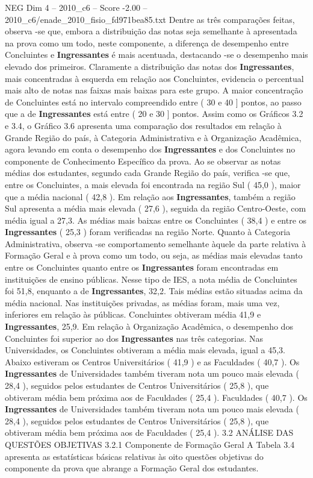 \begin{textsample}{NEG Dim 4 – 2010\_c6 – Score -2.00 – 2010\_c6/enade\_2010\_fisio\_fd971bea85.txt}
Dentre as três comparações feitas, observa -se que, embora a distribuição das notas seja semelhante à apresentada na prova como um todo, neste componente, a diferença de desempenho entre Concluintes e \textbf{Ingressantes} é mais acentuada, destacando -se o desempenho mais elevado dos primeiros.
Claramente a distribuição das notas dos \textbf{Ingressantes}, mais concentradas à esquerda em relação aos Concluintes, evidencia o percentual mais alto de notas nas faixas mais baixas para este grupo.
A maior concentração de Concluintes está no intervalo compreendido entre ( 30 e 40 ] pontos, ao passo que a de \textbf{Ingressantes} está entre ( 20 e 30 ] pontos.
Assim como os Gráficos 3.2 e 3.4, o Gráfico 3.6 apresenta uma comparação dos resultados em relação à Grande Região do país, à Categoria Administrativa e à Organização Acadêmica, agora levando em conta o desempenho dos \textbf{Ingressantes} e dos Concluintes no componente de Conhecimento Específico da prova.
Ao se observar as notas médias dos estudantes, segundo cada Grande Região do país, verifica -se que, entre os Concluintes, a mais elevada foi encontrada na região Sul ( 45,0 ), maior que a média nacional ( 42,8 ).
Em relação aos \textbf{Ingressantes}, também a região Sul apresenta a média mais elevada ( 27,6 ), seguida da região Centro-Oeste, com média igual a 27,3.
As médias mais baixas entre os Concluintes ( 38,4 ) e entre os \textbf{Ingressantes} ( 25,3 ) foram verificadas na região Norte.
Quanto à Categoria Administrativa, observa -se comportamento semelhante àquele da parte relativa à Formação Geral e à prova como um todo, ou seja, as médias mais elevadas tanto entre os Concluintes quanto entre os \textbf{Ingressantes} foram encontradas em instituições de ensino públicas.
Nesse tipo de IES, a nota média de Concluintes foi 51,8, enquanto a de \textbf{Ingressantes}, 32,2.
Tais médias estão situadas acima da média nacional.
Nas instituições privadas, as médias foram, mais uma vez, inferiores em relação às públicas.
Concluintes obtiveram média 41,9 e \textbf{Ingressantes}, 25,9.
Em relação à Organização Acadêmica, o desempenho dos Concluintes foi superior ao dos \textbf{Ingressantes} nas três categorias.
Nas Universidades, os Concluintes obtiveram a média mais elevada, igual a 45,3.
Abaixo estiveram os Centros Universitários ( 41,9 ) e as Faculdades ( 40,7 ).
Os \textbf{Ingressantes} de Universidades também tiveram nota um pouco mais elevada ( 28,4 ), seguidos pelos estudantes de Centros Universitários ( 25,8 ), que obtiveram média bem próxima aos de Faculdades ( 25,4 ).
Faculdades ( 40,7 ).
Os \textbf{Ingressantes} de Universidades também tiveram nota um pouco mais elevada ( 28,4 ), seguidos pelos estudantes de Centros Universitários ( 25,8 ), que obtiveram média bem próxima aos de Faculdades ( 25,4 ). 3.2 ANÁLISE DAS QUESTÕES OBJETIVAS 3.2.1 Componente de Formação Geral A Tabela 3.4 apresenta as estatísticas básicas relativas às oito questões objetivas do componente da prova que abrange a Formação Geral dos estudantes.

\end{textsample}
